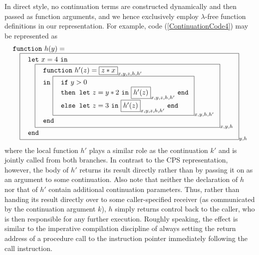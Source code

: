 In direct style, no continuation terms are constructed dynamically and
then passed as function arguments, and we hence exclusively employ
$\lambda$-free function definitions in our representation. For
example, code (\ref{ContinuationCode4}) may be represented as
\begin{equation}
\label{DirectStyleCode1}
\begin{array}{l}
\texttt{function}\ h (y) =\\
\quad
  \fbox{
    $\begin{array}{l}
       \texttt{let}\ x=4\ \texttt{in} \\
       \quad \fbox{
               $\begin{array}{l}
                  \texttt{function}\ h' (z) = \fbox{$z*x$}_{x,y,z,h,h'} \\
                  \texttt{in}\
                    \fbox{
                     $\begin{array}[t]{l}
                        \texttt{if}\ y>0\\
                        \texttt{then\ let}\ z = y*2\ \texttt{in}\ 
                              \fbox{$h'(z)$}_{x,y,z,h,h'}\ \texttt{end}\\
                        \texttt{else\ let}\ z = 3\ \texttt{in}\ 
                              \fbox{$h'(z)$}_{x,y,z,h,h'}\ \texttt{end}
                      \end{array}$}_{x,y,h,h'}\\
                  \texttt{end}
                \end{array}$}_{x,y,h}\\
       \texttt{end}
     \end{array}$}_{y, h}
\end{array}
\end{equation}
where the local function $h'$ plays a similar role as the continuation
$k'$ and is jointly called from both branches. In contrast to the CPS
representation, however, the body of $h'$ returns its result directly
rather than by passing it on as an argument to some continuation. Also
note that neither the declaration of $h$ nor that of $h'$ contain
additional continuation parameters. Thus, rather than handing its
result directly over to some caller-specified receiver (as
communicated by the continuation argument $k$), $h$ simply returns
control back to the caller, who is then responsible for any further
execution. Roughly speaking, the effect is similar to the imperative
compilation discipline of always setting the return address of a
procedure call to the instruction pointer immediately following the
call instruction.

